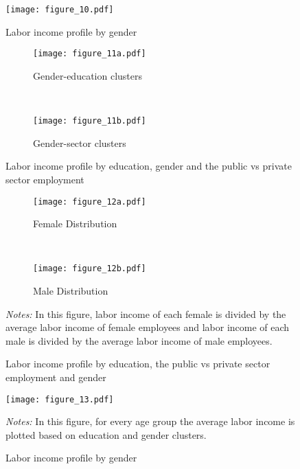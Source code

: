 \documentclass[12pt,author-year]{article}
\begin{document}
\begin{figure}[H]
	\label{figure10}
	\centering
	\texttt{[image: figure\_10.pdf]}
	\caption{Labor income profile by gender}
\end{figure}

\begin{figure}[H]
	\label{figure11}
	\centering
	\begin{subfigure}[b]{0.48\textwidth}
		\texttt{[image: figure\_11a.pdf]}
		\caption{Gender-education clusters}
	\end{subfigure}
	~
	\begin{subfigure}[b]{0.48\textwidth}
		\texttt{[image: figure\_11b.pdf]}
		\caption{Gender-sector clusters}
	\end{subfigure}    
	\caption{Labor income profile by education, gender and the public vs private sector employment}
\end{figure}

\begin{figure}[H]
	\label{figure12}
	\centering
	\begin{subfigure}[b]{0.48\textwidth}
		\texttt{[image: figure\_12a.pdf]}
		\caption{Female Distribution}
	\end{subfigure}
	~
	\begin{subfigure}[b]{0.48\textwidth}
		\texttt{[image: figure\_12b.pdf]}
		\caption{Male Distribution}
	\end{subfigure}    
	\caption{Labor income profile by education, the public vs private sector employment and gender}
	\medskip
	\begin{minipage}{0.75\textwidth} %
		{\footnotesize \textit{Notes:} In this figure, labor income of each female is divided by the average labor income of female employees and labor income of each male is divided by the average labor income of male employees. \par}
	\end{minipage}
\end{figure}

\begin{figure}[H]
	\label{figure13}
	\centering
	\texttt{[image: figure\_13.pdf]}
	\caption{Labor income profile by gender}
	\medskip
	\begin{minipage}{0.75\textwidth} %
		{\footnotesize \textit{Notes:} In this figure, for every age group the average labor income is plotted based on education and gender clusters. \par}
	\end{minipage}
\end{figure}
\end{document}

